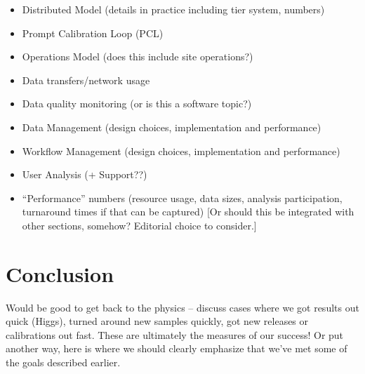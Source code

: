 \documentclass [draft,notitlepage] {article}
\begin{document}
\begin{itemize}

\item Distributed Model (details in practice including tier system, numbers)

\item Prompt Calibration Loop (PCL)

\item Operations Model (does this include site operations?)

\item Data transfers/network usage

\item Data quality monitoring (or is this a software topic?)

\item Data Management (design choices, implementation and performance)

\item Workflow Management (design choices, implementation and performance)

\item User Analysis (+ Support??)

\item ``Performance'' numbers (resource usage, data sizes, analysis participation, turnaround times if that can be captured) [Or should this be integrated with other sections, somehow?  Editorial choice to consider.]
\end{itemize}


\section{Conclusion}
Would be good to get back to the physics -- discuss cases where we got results out quick (Higgs), turned around new samples quickly, got new releases or calibrations out fast.  These are ultimately the measures of our success!  Or put another way, here is where we should clearly emphasize that we’ve met some of the goals described earlier.




\newpage


\end{document}
